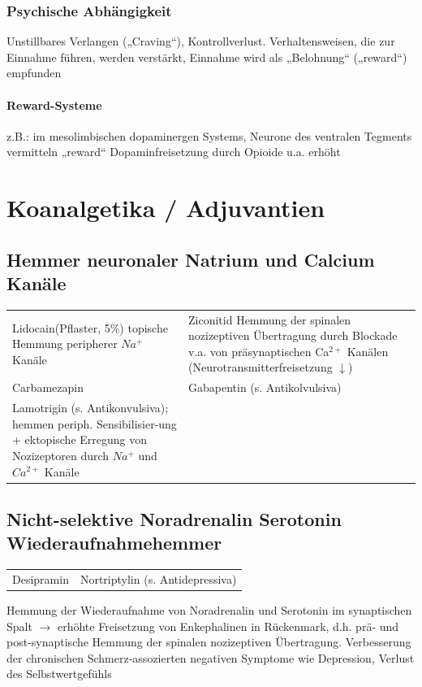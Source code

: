 \documentclass[10pt,a4paper]{report}
\begin{document}
\subsubsection{Psychische Abhängigkeit} %
\label{par:psychische_abh_ngigkeit}
Unstillbares Verlangen („Craving“), Kontrollverlust. Verhaltensweisen, die zur Einnahme führen, werden verstärkt, Einnahme wird als „Belohnung“ („reward“) empfunden
\paragraph{Reward-Systeme} %
\label{subp:reward_systeme}
z.B.: im mesolimbischen dopaminergen Systems, Neurone des ventralen Tegments vermitteln „reward“ Dopaminfreisetzung durch Opioide u.a. erhöht
\section{Koanalgetika / Adjuvantien} %
\label{sec:koanalgetika_adjuvantien}
\subsection{Hemmer neuronaler Natrium und Calcium Kanäle} %
\begin{tabularx}{\textwidth}{XX}
Lidocain(Pflaster, 5\%)  topische Hemmung peripherer $Na^+$ Kanäle&Ziconitid Hemmung der spinalen nozizeptiven Übertragung durch Blockade v.a. von präsynaptischen  Ca$^{2+}$ Kanälen (Neurotransmitterfreisetzung $\downarrow$)\\
Carbamezapin&Gabapentin (s. Antikolvulsiva)\\
Lamotrigin (s. Antikonvulsiva); hemmen periph. Sensibilisier-ung + ektopische Erregung von Nozizeptoren durch $Na^+$ und $Ca^{2+}$ Kanäle\\
\end{tabularx}
\subsection{Nicht-selektive Noradrenalin Serotonin Wiederaufnahmehemmer    } %
\label{sub:nicht_selektive_noradrenalin_serotonin_wiederaufnahmehemmer_}
\begin{tabularx}{\textwidth}{XX}
Desipramin&Nortriptylin (s. Antidepressiva)\\
\end{tabularx}
Hemmung der Wiederaufnahme von Noradrenalin und Serotonin im synaptischen Spalt $\rightarrow$ erhöhte Freisetzung von Enkephalinen in Rückenmark, d.h. prä- und post-synaptische Hemmung der spinalen nozizeptiven Übertragung. Verbesserung der chronischen Schmerz-assozierten negativen Symptome wie Depression, Verlust des Selbstwertgefühls
\end{document}
